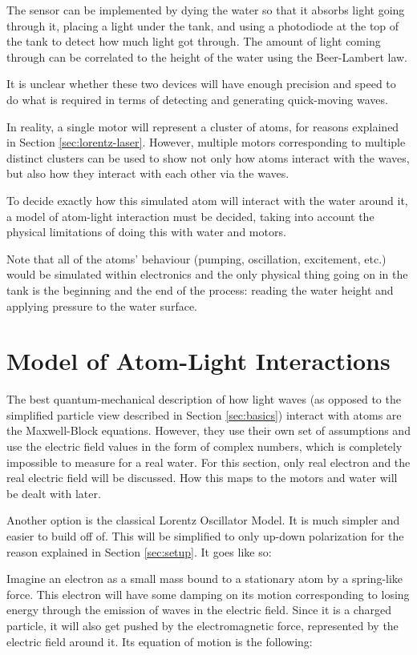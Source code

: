 \documentclass[12pt]{article}
\begin{document}
The sensor can be implemented by dying the water so that it absorbs light going through it, placing a light under the tank, and using a photodiode at the top of the tank to detect how much light got through. The amount of light coming through can be correlated to the height of the water using the Beer-Lambert law.

It is unclear whether these two devices will have enough precision and speed to do what is required in terms of detecting and generating quick-moving waves.

In reality, a single motor will represent a cluster of atoms, for reasons explained in Section \ref{sec:lorentz-laser}. However, multiple motors corresponding to multiple distinct clusters can be used to show not only how atoms interact with the waves, but also how they interact with each other via the waves.

To decide exactly how this simulated atom will interact with the water around it, a model of atom-light interaction must be decided, taking into account the physical limitations of doing this with water and motors.

Note that all of the atoms' behaviour (pumping, oscillation, excitement, etc.) would be simulated within electronics and the only physical thing going on in the tank is the beginning and the end of the process: reading the water height and applying pressure to the water surface.

\section{Model of Atom-Light Interactions}\label{sec:atom-light}

The best quantum-mechanical description of how light waves (as opposed to the simplified particle view described in Section \ref{sec:basics}) interact with atoms are the Maxwell-Block equations. However, they use their own set of assumptions and use the electric field values in the form of complex numbers, which is completely impossible to measure for a real water. For this section, only real electron and the real electric field will be discussed. How this maps to the motors and water will be dealt with later.

Another option is the classical Lorentz Oscillator Model. It is much simpler and easier to build off of. This will be simplified to only up-down polarization for the reason explained in Section \ref{sec:setup}. It goes like so:

Imagine an electron as a small mass bound to a stationary atom by a spring-like force. This electron will have some damping on its motion corresponding to losing energy through the emission of waves in the electric field. Since it is a charged particle, it will also get pushed by the electromagnetic force, represented by the electric field around it. Its equation of motion is the following:
\end{document}
